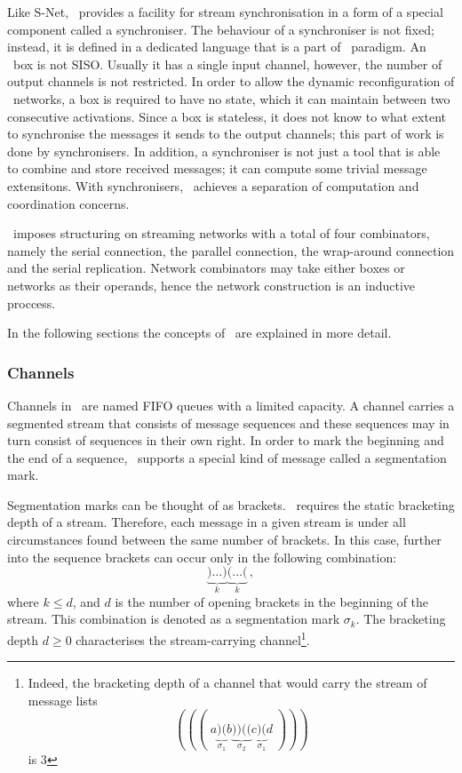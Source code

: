Like S-Net, \ak\ provides a facility for stream synchronisation in a form of a special component called a synchroniser. The behaviour of a synchroniser is not fixed; instead, it is defined in a dedicated language that is a part of \ak\ paradigm. An \ak\ box is not SISO. Usually it has a single input channel, however, the number of output channels is not restricted. In order to allow the dynamic reconfiguration of \ak\ networks, a box is required to have no state, which it can maintain between two consecutive activations. Since a box is stateless, it does not know to what extent to synchronise the messages it sends to the output channels; this part of work is done by synchronisers. In addition, a synchroniser is not just a tool that is able to combine and store received messages; it can compute some trivial message extensitons. With synchronisers, \ak\ achieves a separation of computation and coordination concerns.

\ak\ imposes structuring on streaming networks with a total of four combinators, namely the serial connection, the parallel connection, the wrap-around connection and the serial replication. Network combinators may take either boxes or networks as their operands, hence the network construction is an inductive proccess. 

In the following sections the concepts of \ak\ are explained in more detail.


    \subsubsection{Channels}
Channels in \ak\ are named FIFO queues with a limited capacity. A channel carries a segmented stream that consists of message sequences and these sequences may in turn consist of sequences in their own right. In order to mark the beginning and the end of a sequence, \ak\ supports a special kind of message called a segmentation mark.

Segmentation marks can be thought of as brackets. \ak\ requires the static bracketing depth of a stream. Therefore, each message in a given stream is under all circumstances found between the same number of brackets. In this case, further into the sequence brackets can occur only in the following combination:
\[
\underbrace{)\ldots)}_k \underbrace{(\ldots(}_k\,,
\]
where $k \le d$, and $d$ is the number of opening brackets in the beginning of the stream. This combination is denoted as a segmentation mark $\sigma_k$. The bracketing depth $d \ge 0$ characterises the stream-carrying channel\footnote{Indeed, the bracketing depth of a channel that would carry the stream of message lists
\[
(((\;a\underbrace{)(}_{\sigma_1}b\underbrace{))((}_{\sigma_2}c\underbrace{)(}_{\sigma_1}d\;)))
\]
is 3}.


